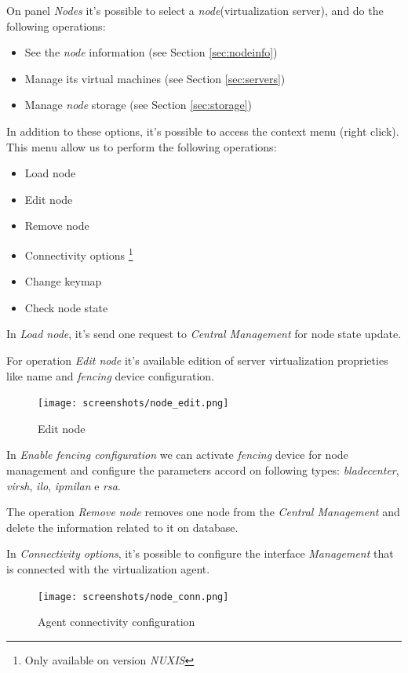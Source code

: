 On panel \emph{Nodes} it's possible to select a \emph{node}(virtualization server), and do the following operations:
\begin{itemize}
    \item See the \emph{node} information (see Section \ref{sec:nodeinfo})
    \item Manage its virtual machines (see Section \ref{sec:servers})
    \item Manage \emph{node} storage (see Section  \ref{sec:storage})
\end{itemize}

In addition to these options, it's possible to access the context menu (right click). This menu allow us to perform the following operations:
\begin{itemize}
    \item Load node
    \item Edit node
    \item Remove node
    \item Connectivity options \footnote{Only available on version \emph{NUXIS}}
    \item Change keymap
    \item Check node state
\end{itemize}

In \emph{Load node}, it's send one request to \emph{Central Management} for node state update.

For operation \emph{Edit node} it's available edition of server virtualization proprieties like name and \emph{fencing} device configuration.
\begin{figure}[H]
       \begin{center}
       \texttt{[image: screenshots/node\_edit.png]}
       \caption{Edit node}
       \label{fig:node_edit}
       \end{center}
\end{figure}
\label{para:node_fencing_config}In \emph{Enable \emph{fencing} configuration} we can activate \emph{fencing} device for node management and configure the parameters accord on following types: \emph{bladecenter}, \emph{virsh}, \emph{ilo}, \emph{ipmilan} e \emph{rsa}.

The operation \emph{Remove node} removes one node from the \emph{Central Management} and delete the information related to it on database.

In \emph{Connectivity options}, it's possible to configure the interface \emph{Management} that is connected with the virtualization agent. 
\begin{figure}[H]
	\begin{center}
	\texttt{[image: screenshots/node\_conn.png]}
	\caption{Agent connectivity configuration}
	\label{fig:node_conn}
	\end{center}
\end{figure}

